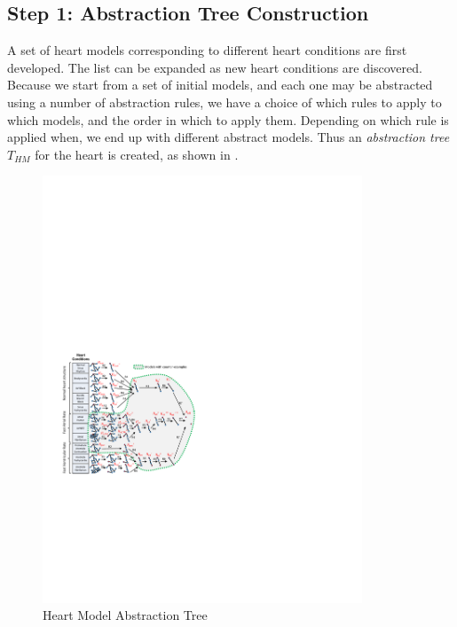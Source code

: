 \subsection*{Step 1: Abstraction Tree Construction}
A set of heart models corresponding to different heart conditions are first developed. 
The list can be expanded as new heart conditions are discovered.
Because we start from a set of initial models, and each one may be abstracted using a number of abstraction rules, we have a choice of which rules to apply to which models, and the order in which to apply them. 
Depending on which rule is applied when, we end up with different abstract models.
Thus an \emph{abstraction tree} $T_{HM}$ for the heart is created, as shown in . 
\begin{figure}[!t]
	\centering
	\includegraphics[width=0.85\textwidth]{figs/abs.pdf}
	\caption{\small Heart Model Abstraction Tree}
	\vspace{-15pt}
	\label{fig:HM_tree}
\end{figure}

